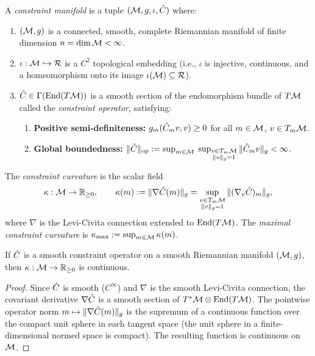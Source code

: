 \begin{definition}
\label{def:3.7}
A \emph{constraint manifold} is a tuple $(\mathcal{M}, g, \iota, \hat{C})$ where:
\begin{enumerate}
  \item[(C1)] $(\mathcal{M}, g)$ is a connected, smooth, complete Riemannian
    manifold of finite dimension $n = \dim\mathcal{M} < \infty$.
  \item[(C2)] $\iota : \mathcal{M} \hookrightarrow \mathcal{R}$ is a $C^2$ topological
    embedding (i.e., $\iota$ is injective, continuous, and a homeomorphism
    onto its image $\iota(\mathcal{M}) \subseteq \mathcal{R}$).
  \item[(C3)] $\hat{C} \in \Gamma(\mathrm{End}(T\mathcal{M}))$ is a smooth section
    of the endomorphism bundle of $T\mathcal{M}$ called the \emph{constraint
    operator}, satisfying:
    \begin{enumerate}
      \item[(C3a)] \textbf{Positive semi-definiteness:}
        $g_m(\hat{C}_m v, v) \geq 0$ for all $m \in \mathcal{M}$, $v \in T_m\mathcal{M}$.
      \item[(C3b)] \textbf{Global boundedness:}
        $\|\hat{C}\|_{\mathrm{op}} := \sup_{m \in \mathcal{M}}\; \sup_{\substack{v \in T_m\mathcal{M} \\ \|v\|_g = 1}} \|\hat{C}_m v\|_g < \infty$.
    \end{enumerate}
\end{enumerate}
\end{definition}

\begin{definition}
\label{def:3.8}
The \emph{constraint curvature} is the scalar field
\[
  \kappa : \mathcal{M} \to \mathbb{R}_{\geq 0},
  \qquad
  \kappa(m) := \|\nabla \hat{C}(m)\|_g
    = \sup_{\substack{v \in T_m\mathcal{M} \\ \|v\|_g = 1}}
      \|(\nabla_v \hat{C})_m\|_g,
\]
where $\nabla$ is the Levi-Civita connection extended to
$\mathrm{End}(T\mathcal{M})$.  The \emph{maximal constraint curvature} is
$\kappa_{\max} := \sup_{m \in \mathcal{M}} \kappa(m)$.
\end{definition}

\begin{lemma}
\label{lem:3.2}
If $\hat{C}$ is a smooth constraint operator on a smooth Riemannian
manifold $(\mathcal{M}, g)$, then $\kappa : \mathcal{M} \to \mathbb{R}_{\geq 0}$ is
continuous.
\end{lemma}

\begin{proof}
Since $\hat{C}$ is smooth ($C^\infty$) and $\nabla$ is the smooth
Levi-Civita connection, the covariant derivative $\nabla\hat{C}$ is a
smooth section of $T^*\mathcal{M} \otimes \mathrm{End}(T\mathcal{M})$.  The pointwise
operator norm $m \mapsto \|\nabla\hat{C}(m)\|_g$ is the supremum of a
continuous function over the compact unit sphere in each tangent space
(the unit sphere in a finite-dimensional normed space is compact).  The
resulting function is continuous on $\mathcal{M}$.
\end{proof}

